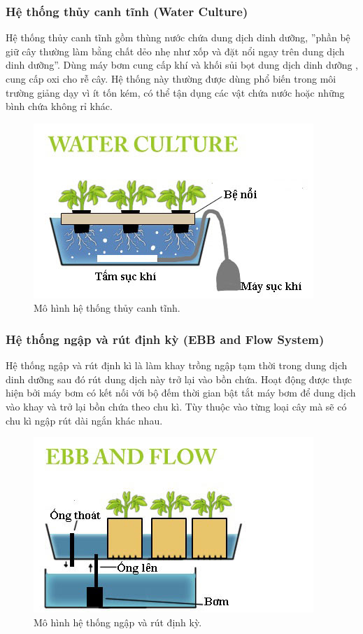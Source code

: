 \documentclass[a4paper,12pt,oneside]{article}
\begin{document}
\subsubsection{Hệ thống thủy canh tĩnh (Water Culture)}
\noindent Hệ thống thủy canh tĩnh gồm thùng nước chứa dung dịch dinh dưỡng, ”phần bệ giữ cây thường làm bằng chất dẻo nhẹ như xốp và đặt nổi ngay trên dung dịch dinh dưỡng”\cite{thuycanh}. Dùng máy bơm cung cấp khí và khối sủi bọt dung dịch dinh dưỡng , cung cấp oxi cho rễ cây. Hệ thống này thường được dùng phổ biến trong môi trường giảng dạy vì ít tốn kém, có thể tận dụng các vật chứa nước hoặc những bình chứa không rỉ khác.

\begin{figure}[H]
	\centering
	\includegraphics[scale=.8]{hinh/Water_culture.jpg}
	\caption{Mô hình hệ thống thủy canh tĩnh\cite{thuycanh}.}
	\label{fig:Water_culture}
\end{figure}

\subsubsection{Hệ thống ngập và rút định kỳ (EBB and Flow System)}

\noindent Hệ thống ngập và rút định kì là làm khay trồng ngập tạm thời trong dung dịch dinh dưỡng sau đó rút dung dịch này trở lại vào bồn chứa. Hoạt động được thực hiện bởi máy bơm có kết nối với bộ đếm thời gian bật tắt máy bơm để dung dịch vào khay và trở lại bồn chứa theo chu kì. Tùy thuộc vào từng loại cây mà sẽ có chu kì ngập rút dài ngắn khác nhau.

\begin{figure}[H]
	\centering
	\includegraphics[scale=.9]{hinh/ebb_flow.jpg}
	\caption{Mô hình hệ thống ngập và rút định kỳ\cite{thuycanh}.}
	\label{fig:ebb_flow}
\end{figure}
\end{document}
